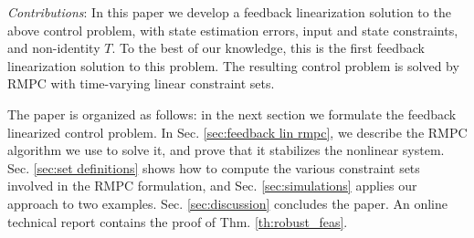 \emph{Contributions}: In this paper we develop a feedback linearization solution to the above control problem, with state estimation errors, input and state constraints, and non-identity $T$.
To the best of our knowledge, this is the first feedback linearization solution to this problem.
The resulting control problem is solved by RMPC with time-varying linear constraint sets.

The paper is organized as follows: in the next section we formulate the feedback linearized control problem. In Sec. \ref{sec:feedback lin rmpc}, we describe the RMPC algorithm we use to solve it, and prove that it stabilizes the nonlinear system. 
Sec. \ref{sec:set definitions} shows how to compute the various constraint sets involved in the RMPC formulation, and Sec. \ref{sec:simulations} applies our approach to two examples. Sec. \ref{sec:discussion} concludes the paper. 
An online technical report \cite{PantAM16_RMPC} contains the proof of Thm. \ref{th:robust_feas}.